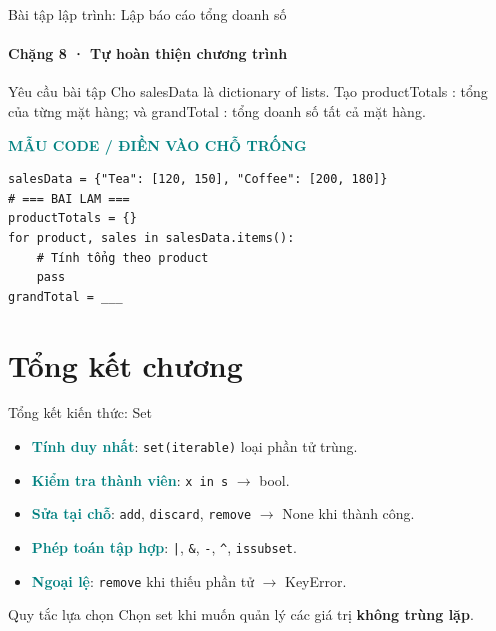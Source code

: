 \documentclass[aspectratio=169,10pt]{beamer}
\newcommand{\term}[1]{\textcolor{teal}{\textbf{#1}}}
\newcommand{\py}[1]{{\color{deepnavy}\texttt{#1}}}
\begin{document}
\begin{frame}[fragile,t]{Bài tập lập trình: Lập báo cáo tổng doanh số}
\framesubtitle{Chặng 8 · Tự hoàn thiện chương trình}
\begin{block}{Yêu cầu bài tập}
Cho salesData là dictionary of lists. Tạo productTotals : tổng của từng mặt hàng; và grandTotal : tổng doanh số tất cả mặt hàng.
\end{block}
\textcolor{teal}{\scriptsize\textbf{MẪU CODE / ĐIỀN VÀO CHỖ TRỐNG}}\par
\begin{Verbatim}[fontsize=\scriptsize,frame=single,framesep=3mm,rulecolor=\color{teal!35},breaklines=true]
salesData = {"Tea": [120, 150], "Coffee": [200, 180]}
# === BAI LAM ===
productTotals = {}
for product, sales in salesData.items():
    # Tính tổng theo product
    pass
grandTotal = ___
\end{Verbatim}
\end{frame}

\section{Tổng kết chương}

\begin{frame}[t]{Tổng kết kiến thức: Set}

\begin{itemize}
\item \term{Tính duy nhất}: \py{set(iterable)} loại phần tử trùng.
\item \term{Kiểm tra thành viên}: \py{x in s} $\rightarrow$ bool.
\item \term{Sửa tại chỗ}: \py{add}, \py{discard}, \py{remove} $\rightarrow$ None khi thành công.
\item \term{Phép toán tập hợp}: \py{|}, \py{\&}, \py{-}, \py{\^{}}, \py{issubset}.
\item \term{Ngoại lệ}: \py{remove} khi thiếu phần tử $\rightarrow$ KeyError.
\end{itemize}
\begin{block}{Quy tắc lựa chọn} Chọn set khi muốn quản lý các giá trị \textbf{không trùng lặp}. \end{block}

\end{frame}
\end{document}

